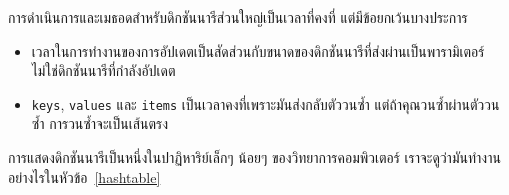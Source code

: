 การดำเนินการและเมธอดสำหรับดิกชันนารีส่วนใหญ่เป็นเวลาที่คงที่ แต่มีข้อยกเว้นบางประการ

\begin{itemize}

  
\item เวลาในการทำงานของการอัปเดตเป็นสัดส่วนกับขนาดของดิกชันนารีที่ส่งผ่านเป็นพารามิเตอร์ ไม่ใช่ดิกชันนารีที่กำลังอัปเดต

  
\item {\tt keys}, {\tt values} และ {\tt items} เป็นเวลาคงที่เพราะมันส่งกลับตัววนซ้ำ แต่ถ้าคุณวนซ้ำผ่านตัววนซ้ำ การวนซ้ำจะเป็นเส้นตรง 


\end{itemize}

การแสดงดิกชันนารีเป็นหนึ่งในปาฏิหาริย์เล็กๆ น้อยๆ ของวิทยาการคอมพิวเตอร์ เราจะดูว่ามันทำงานอย่างไรในหัวข้อ~\ref{hashtable}

